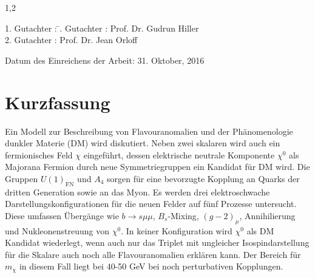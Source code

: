\documentclass[11pt,a4paper,twoside]{article}
\numberwithin{equation}{section}
\newcommand{\FN}{U(1)_\text{FN}}
\begin{document}
\begin{spacing}{1,2}
\thispagestyle{empty}
\vspace*{\fill}
\begin{tabbing}
1. Gutachter : \=. Gutachter : \>Prof. Dr. Gudrun Hiller \\[11pt]
2. Gutachter : \>Prof. Dr. Jean Orloff \\[11pt]
\end{tabbing}
\vspace{11pt}
Datum des Einreichens der Arbeit: 31. Oktober, 2016
\newpage
% 



\thispagestyle{empty}
 \section*{Kurzfassung}
 Ein Modell zur Beschreibung von Flavouranomalien und der Phänomenologie dunkler Materie (DM) wird diskutiert. Neben zwei skalaren wird auch ein fermionisches
 Feld $\chi$ eingeführt, dessen elektrische neutrale Komponente $\chi^0$ als Majorana Fermion durch neue Symmetriegruppen ein Kandidat für DM wird. Die 
 Gruppen $\FN$ und $A_4$ sorgen für eine bevorzugte Kopplung an Quarks der dritten Generation sowie an das Myon. 
 Es werden drei elektroschwache
 Darstellungskonfigurationen für die neuen Felder auf fünf Prozesse untersucht. Diese umfassen Übergänge wie $b\rightarrow s\mu\mu$, $B_s$-Mixing,
 $(g-2)_\mu$, Annihilierung und Nukleonenstreuung von $\chi^0$. In keiner Konfiguration wird $\chi^0$ als DM Kandidat wiederlegt, wenn auch nur
 das Triplet mit ungleicher Isospindarstellung für die Skalare auch noch alle Flavouranomalien erklären kann. Der Bereich für $m_\chi$ in diesem Fall
 liegt bei 40-50 GeV bei noch perturbativen Kopplungen.

\end{spacing}
\end{document}
